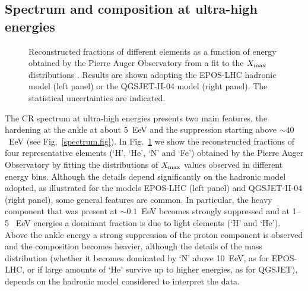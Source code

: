 \documentclass[twoside,12pt]{article}
\begin{document}
\subsection{Spectrum and composition at ultra-high energies}

\begin{figure}[tb]
\begin{center}
\begin{minipage}[t]{8 cm}
\centerline{}
\end{minipage}
\caption{Reconstructed fractions of different elements as a function of energy obtained by the Pierre Auger Observatory from a fit to the $X_{\rm max}$ distributions \cite{augerxmax}. Results are shown adopting the EPOS-LHC hadronic model (left panel) or the QGSJET-II-04 model (right panel). The statistical uncertainties are indicated.\label{augercomp.fig}}
\end{center}
\end{figure}

The CR spectrum at ultra-high energies presents two main features, the hardening at the ankle at about 5~EeV and the suppression starting above $\sim 40$~EeV (see Fig.~\ref{spectrum.fig}). In Fig.~\ref{augercomp.fig} we show the reconstructed fractions of four representative elements (`H', `He', `N' and `Fe') obtained by the Pierre Auger Observatory \cite{sein} by fitting the distributions  of $X_{\rm max}$ values observed in different energy bins. Although the details depend significantly  on the hadronic model adopted, as illustrated for the models EPOS-LHC (left panel) and QGSJET-II-04 (right panel),  some general features are common. In particular, the heavy component that was present at $\sim 0.1$~EeV becomes strongly suppressed and at 1--5~ EeV energies a dominant fraction is due to light elements (`H' and `He'). Above the ankle energy  a strong suppression of the proton component is observed and the composition  becomes heavier,  although the details of the mass distribution (whether it becomes dominated by `N' above 10~EeV, as for EPOS-LHC, or if large amounts of `He' survive up to higher energies, as for QGSJET),  depends on the hadronic model considered to interpret the data. 
\end{document}
